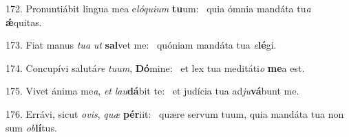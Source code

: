 172. Pronuntiábit lingua mea e\textit{ló}\textit{qui}\textit{um} \textbf{tu}um: \ast\  quia ómnia mandáta tu\textit{a} \textbf{ǽ}quitas.\

173. Fiat manus \textit{tu}\textit{a} \textit{ut} \textbf{sal}vet me: \ast\  quóniam mandáta tua \textit{e}\textbf{lé}gi.\

174. Concupívi salutá\textit{re} \textit{tu}\textit{um}, \textbf{Dó}mine: \ast\  et lex tua meditáti\textit{o} \textbf{me}a est.\

175. Vivet ánima me\textit{a}, \textit{et} \textit{lau}\textbf{dá}bit te: \ast\  et judícia tua ad\textit{ju}\textbf{vá}bunt me.\

176. Errávi, sicut \textit{o}\textit{vis}, \textit{quæ} \textbf{pér}iit: \ast\  quære servum tuum, quia mandáta tua non sum \textit{ob}\textbf{lí}tus.\

